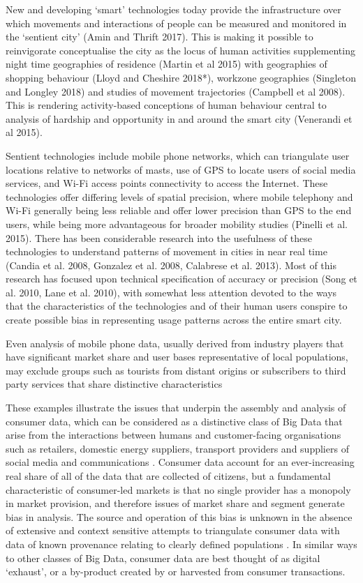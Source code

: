 New and developing ‘smart’ technologies today provide the infrastructure over
which movements and interactions of people can be measured and monitored in the
‘sentient city’ (Amin and Thrift 2017). This is making it possible to
reinvigorate conceptualise the city as the locus of human activities
supplementing night time geographies of residence (Martin et al 2015) with
geographies of shopping behaviour (Lloyd and Cheshire 2018*), workzone
geographies (Singleton and Longley 2018) and studies of movement trajectories
(Campbell et al 2008). This is rendering activity-based conceptions of human
behaviour central to analysis of hardship and opportunity in and around the
smart city (Venerandi et al 2015).

Sentient technologies include mobile phone networks, which can triangulate user
locations relative to networks of masts, use of GPS to locate users of social
media services, and Wi-Fi access points connectivity to access the Internet.
These technologies offer differing levels of spatial precision, where mobile
telephony and Wi-Fi generally being less reliable and offer lower precision than
GPS to the end users, while being more advantageous for broader mobility studies
(Pinelli et al.  2015). There has been considerable research into the usefulness
of these technologies to understand patterns of movement in cities in near real
time (Candia et al. 2008, Gonzalez et al. 2008, Calabrese et al. 2013).  Most of
this research has focused upon technical specification of accuracy or precision
(Song et al. 2010, Lane et al. 2010), with somewhat less attention devoted to
the ways that the characteristics of the technologies and of their human users
conspire to create possible bias in representing usage patterns across the
entire smart city. 

Even analysis of mobile phone data, usually derived from industry players that
have significant market share and user bases representative of local
populations, may exclude groups such as tourists from distant origins or
subscribers to third party services that share distinctive characteristics
\citep{di2016mind}

These examples illustrate the issues that underpin the assembly and analysis of
consumer data, which can be considered as a distinctive class of Big Data that
arise from the interactions between humans and customer-facing organisations
such as retailers, domestic energy suppliers, transport providers and suppliers
of social media and communications \citep{cdrc2018consumer}.  Consumer data
account for an ever-increasing real share of all of the data that are collected
of citizens, but a fundamental characteristic of consumer-led markets is that no
single provider has a monopoly in market provision, and therefore issues of
market share and segment generate bias in analysis.  The source and operation of
this bias is unknown in the absence of extensive and context sensitive attempts
to triangulate consumer data with data of known provenance relating to clearly
defined populations \citep{lansley2016deriving}.  In similar ways to other
classes of Big Data, consumer data are best thought of as digital ‘exhaust’, or
a by-product created by or harvested from consumer transactions.

